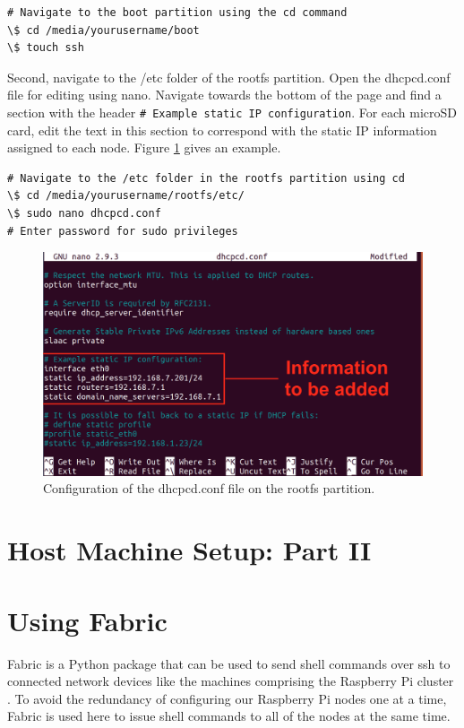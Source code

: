 \documentclass[sigconf]{acmart}
\begin{document}
\begin{lstlisting}
# Navigate to the boot partition using the cd command
\$ cd /media/yourusername/boot
\$ touch ssh
\end{lstlisting}

Second, navigate to the /etc folder of the rootfs partition. Open the dhcpcd.conf file for editing using nano. Navigate towards the bottom of the page and find a section with the header {\tt \# Example static IP configuration}. For each microSD card, edit the text in this section to correspond with the static IP information assigned to each node. Figure \ref{f:dhcpcd2} gives an example.

\begin{lstlisting}
# Navigate to the /etc folder in the rootfs partition using cd
\$ cd /media/yourusername/rootfs/etc/
\$ sudo nano dhcpcd.conf
# Enter password for sudo privileges 
\end{lstlisting}

\begin{figure}[!ht]
  \centering\includegraphics[width=\columnwidth]{images/dhcpcd2.png}
  \caption{Configuration of the dhcpcd.conf file on the rootfs partition.}\label{f:dhcpcd2}
\end{figure}

\section{Host Machine Setup: Part II}

\section{Using Fabric}

Fabric is a Python package that can be used to send shell commands over ssh to connected network devices like the machines comprising the Raspberry Pi cluster \cite{fabric2018}. To avoid the redundancy of configuring our Raspberry Pi nodes one at a time, Fabric is used here to issue shell commands to all of the nodes at the same time.
\end{document}
